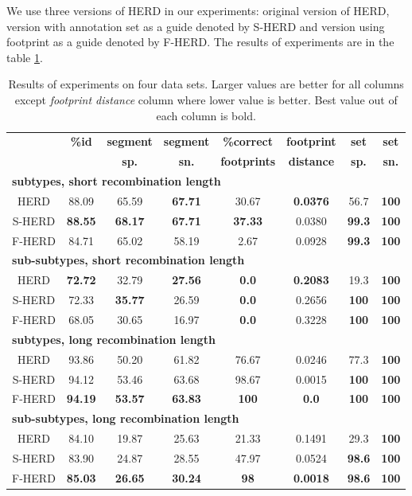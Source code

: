 We use three versions of HERD in our experiments: original version of HERD,
version with annotation set as a guide denoted by S-HERD and version using
footprint as a guide denoted by F-HERD. The results of experiments are in the
table \ref{HERD:EXPTABLE}. 

\begin{table}
\begin{center}
\begin{tabular}{cccccccc}\hline
&{\bf \%id}&\bf segment&\bf segment&\bf \%correct&\bf footprint&\bf set&\bf  set\\ 
&&\bf sp.& \bf sn.& \bf footprints&\bf distance&\bf    sp.&\bf  sn.\\ 
\hline
\hline
\multicolumn{8}{l}{\bf subtypes, short recombination length}\\
HERD   &88.09& 65.59& {\bf 67.71}& 30.67& {\bf 0.0376}& 56.7&{\bf 100}\\
S-HERD &{\bf 88.55}& {\bf 68.17}& {\bf 67.71}& {\bf 37.33}& 0.0380& {\bf 99.3}&{\bf 100}\\
F-HERD &84.71& 65.02& 58.19& 2.67& 0.0928& {\bf 99.3}&{\bf 100}\\\hline
\multicolumn{8}{l}{\bf sub-subtypes, short recombination length}\\
HERD   &{\bf 72.72}& 32.79& {\bf 27.56}& {\bf 0.0}&    {\bf 0.2083}& 19.3&{\bf 100}\\
S-HERD &72.33&{\bf 35.77}& 26.59& {\bf 0.0}&    0.2656& {\bf 100}&{\bf 100}\\
F-HERD &68.05&30.65& 16.97& {\bf 0.0}&    0.3228& {\bf 100}&{\bf 100}\\\hline
\multicolumn{8}{l}{\bf subtypes, long recombination length}\\
HERD   &93.86& 50.20& 61.82& 76.67& 0.0246& 77.3&{\bf 100}\\
S-HERD &94.12& 53.46& 63.68& 98.67& 0.0015&   {\bf 100}&{\bf 100}\\
F-HERD &{\bf 94.19}& {\bf 53.57}& {\bf 63.83}& {\bf 100}&    {\bf 0.0}&
{\bf 100}&{\bf 100}\\\hline
\multicolumn{8}{l}{\bf sub-subtypes, long recombination length}\\
HERD   &84.10& 19.87& 25.63& 21.33& 0.1491& 29.3&{\bf 100}\\
S-HERD &83.90& 24.87& 28.55& 47.97& 0.0524& {\bf 98.6}&{\bf 100}\\
F-HERD &{\bf 85.03}& {\bf 26.65}& {\bf 30.24}& {\bf 98}&   {\bf 0.0018}& {\bf
98.6}&{\bf 100}\\
\end{tabular}
\end{center}
\caption[Results of F/S-HERD on artificial recombinants.]{Results of experiments
on four data sets. Larger values are better for all columns  except
{\it footprint distance} column where lower value is better. Best value out of
each column is bold.}\label{HERD:EXPTABLE}
\end{table}

